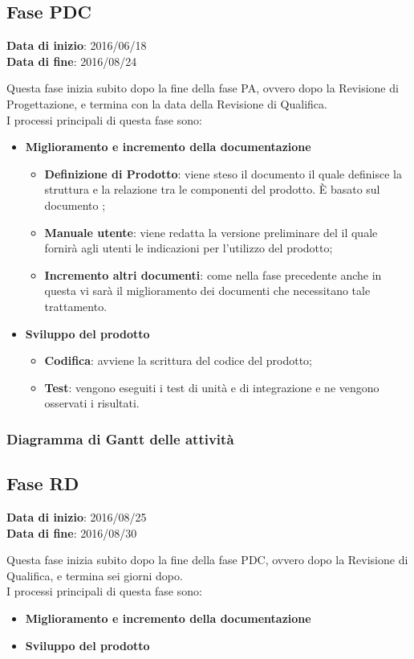 	\subsection{Fase PDC}
	\begin{center}
		\textbf{Data di inizio}: 2016/06/18 \\
		\textbf{Data di fine}: 2016/08/24 \\
	\end{center}
	Questa fase inizia subito dopo la fine della fase PA, ovvero dopo la Revisione di Progettazione, e termina con la data della Revisione di Qualifica. \\
	I processi principali di questa fase sono: 
		\begin{itemize}
			\item \textbf{Miglioramento e incremento della documentazione}
			\att
			\begin{itemize}
				\item \textbf{Definizione di Prodotto}: viene steso il documento \DPdoc il quale definisce la struttura e la relazione tra le componenti del prodotto. È basato sul documento \STdoc;
				\item \textbf{Manuale utente}: viene redatta la versione preliminare del \MUdoc il quale fornirà agli utenti le indicazioni per l'utilizzo del prodotto;
				\item \textbf{Incremento altri documenti}: come nella fase precedente anche in questa vi sarà il miglioramento dei documenti che necessitano tale trattamento.
			\end{itemize}
			\item \textbf{Sviluppo del prodotto}
			\att
			\begin{itemize}
				\item \textbf{Codifica}: avviene la scrittura del codice del prodotto;
				\item \textbf{Test}: vengono eseguiti i test di unità e di integrazione e ne vengono osservati i risultati. 
			\end{itemize}
		\end{itemize}
		\subsubsection{Diagramma di Gantt delle attività}
		
	\subsection{Fase RD}
	\begin{center}
		\textbf{Data di inizio}: 2016/08/25 \\
		\textbf{Data di fine}: 2016/08/30 \\
	\end{center}
	Questa fase inizia subito dopo la fine della fase PDC, ovvero dopo la Revisione di Qualifica, e termina sei giorni dopo. \\
	I processi principali di questa fase sono: 
		\begin{itemize}
			\item \textbf{Miglioramento e incremento della documentazione}
			\att
			\item \textbf{Sviluppo del prodotto}
			\att
		\end{itemize}
